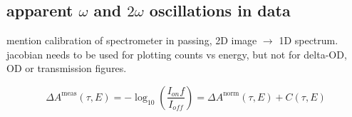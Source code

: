 \subsection{apparent $\omega$ and $2\omega$ oscillations in data}



mention calibration of spectrometer in passing, 2D image $\rightarrow$ 1D spectrum. jacobian needs to be used for plotting counts vs energy, but not for delta-OD, OD or transmission figures.

\begin{equation}
\Delta A^{\text{meas}}(\tau, E) = -\log_{10} \left( \frac{I_{on} f}{I_{off}} \right) = \Delta A^{\text{norm}}(\tau,E) + C(\tau,E)
\label{eqn:deltaA_linear_correction}
\end{equation}
